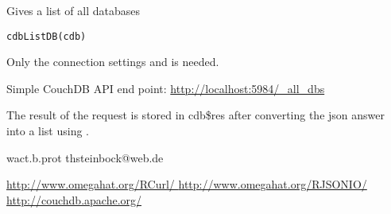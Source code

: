 \begin{Description}\relax
Gives a list of all databases
\end{Description}
\begin{Usage}
\begin{verbatim}
cdbListDB(cdb)
\end{verbatim}
\end{Usage}
\begin{Arguments}
\begin{ldescription}
\item[\code{cdb}] Only the  connection settings  and
 is needed.

\end{ldescription}
\end{Arguments}
\begin{Details}\relax
Simple CouchDB API end point: \url{http://localhost:5984/_all_dbs}
\end{Details}
\begin{Value}
\begin{ldescription}
\item[\code{cdb }] The result of the request is stored in cdb\$res after
converting the json answer into a list using .

\end{ldescription}
\end{Value}
\begin{Author}\relax
wact.b.prot
thsteinbock@web.de
\end{Author}
\begin{References}\relax
\url{  http://www.omegahat.org/RCurl/        }
\url{  http://www.omegahat.org/RJSONIO/      }
\url{  http://couchdb.apache.org/            }
\end{References}
\begin{SeeAlso}\relax
{}
\end{SeeAlso}
\begin{Examples}
\end{Examples}

